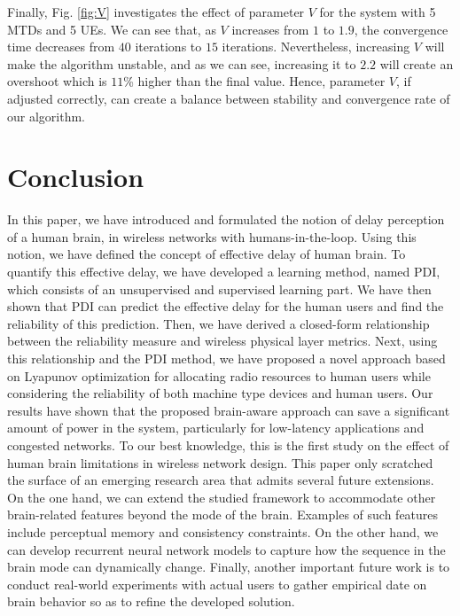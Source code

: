 \documentclass[journal,draftclsnofoot,onecolumn,12pt]{IEEEtran}%
\begin{document}
Finally, Fig. \ref{fig:V} investigates the effect of parameter $V$ for the system with 5 MTDs and 5 UEs. We can see that, as $V$ increases from $1$ to $1.9$, the convergence time decreases from $40$ iterations to $15$ iterations. Nevertheless, increasing $V$ will make the algorithm unstable, and as we can see, increasing it to $2.2$ will create an overshoot which is $11$\% higher than the final value. Hence, parameter $V$, if adjusted correctly, can create a balance between stability and  convergence rate  of our algorithm.      
	\section{Conclusion}
	
	In this paper, we have introduced and formulated the notion of delay perception of a human brain, in wireless networks with humans-in-the-loop. Using this notion, we have defined the concept of effective delay of human brain. { To quantify this effective delay, we have developed a  learning method, named PDI, which consists of an unsupervised and supervised learning part.} We have then shown that PDI can predict the effective delay for the human users and find the  reliability of this prediction. Then, we have derived a closed-form relationship between the reliability measure and wireless physical layer metrics. Next, using this relationship and the PDI method, we have proposed a novel approach based on Lyapunov optimization for allocating radio resources to human users while considering the reliability of both machine type devices and human users. 
	Our results have shown that the proposed brain-aware approach can save a significant amount of power in the system, particularly for low-latency applications and congested networks. To our best knowledge, this is the first study on the effect of human brain limitations in wireless network design.
This paper only scratched the surface of an emerging research area that admits several future extensions. On the one hand, we can extend the studied framework to accommodate other brain-related features beyond the mode of the brain. Examples of such features include perceptual memory and consistency constraints. On the other hand, we can develop recurrent neural network models to capture how the sequence in the brain mode can dynamically change. Finally, another important future work is to conduct real-world experiments with actual users to gather empirical date on brain behavior so as to refine the developed solution.
	
	
\end{document}
